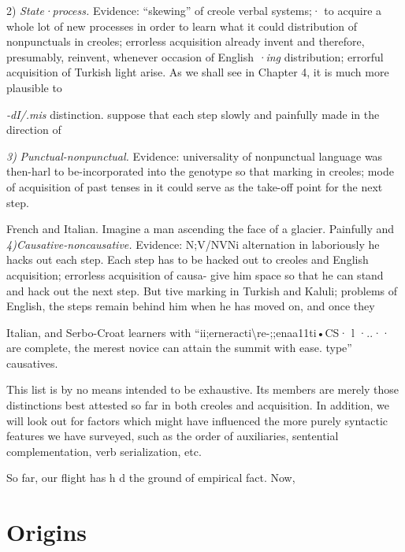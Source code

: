 2) \textit{State}\textit{·}\textit{process.} Evidence: ``skewing'' of creole verbal systems;· to acquire a whole lot of new processes in order to learn what it could distribution of nonpunctuals in creoles; errorless acquisition already invent and therefore, presumably, reinvent, whenever occasion of English \textit{·}\textit{ing }distribution; errorful acquisition of Turkish l{\textquotedbl}ight arise. As we shall see in Chapter 4, it is much more plausible to

\textit{{}-dI/.mis} distinction. suppose that each step slowly and painfully made in the direction of

\textit{3}\textit{)} \textit{Punctual-nonpunctual. }Evidence: universality of nonpunctual language was then-harl to be-incorporated into the genotype so that marking in creoles; mode of acquisition of past tenses in it could serve as the take-off point for the next step.

French and Italian. Imagine a man ascending the face of a glacier. Painfully and \textit{4)Causative-noncausative. }Evidence: N;V/NVNi alternation in laboriously he hacks out each step. Each step has to be hacked out to creoles and English acquisition; errorless acquisition of causa- give him space so that he can stand and hack out the next step. But tive marking in Turkish and Kaluli; problems of English, the steps remain behind him when he has moved on, and once they

Italian, and Serbo-Croat learners with ``ii;erneracti{\textbackslash}re-;;enaa11ti•CS· l ·..·· are complete, the merest novice can attain the summit with ease. type'' causatives.

This list is by no means intended to be exhaustive. Its members are merely those distinctions best attested so far in both creoles and acquisition. In addition, we will look out for factors which might have influenced the more purely syntactic features we have surveyed, such as the order of auxiliaries, sentential complementation, verb serialization, etc.

So far, our flight has h d the ground of empirical fact. Now,


\chapter{Origins}

